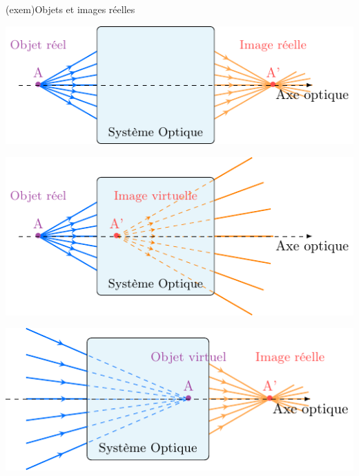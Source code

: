 \documentclass[../../main/main.tex]{subfiles}
\begin{document}
\begin{tcb}[label=exem:rellvirt](exem){Objets et images réelles}
	\begin{minipage}{0.45\linewidth}
		\begin{center}
			\includegraphics[width=\linewidth]{obj_r-img_r.pdf}
			\label{fig:objrimgr}
		\end{center}
	\end{minipage}
	\hfill
	\begin{minipage}{0.45\linewidth}
		\begin{center}
			\includegraphics[width=\linewidth]{obj_r-img_v.pdf}
			\label{fig:objrimgv}
		\end{center}
	\end{minipage}
	\begin{minipage}{0.45\linewidth}
		\begin{center}
			\includegraphics[width=\linewidth]{obj_v-img_r.pdf}

\end{center}
\end{minipage}
\end{tcb}
\end{document}
